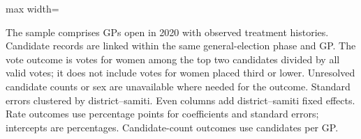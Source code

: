 \begin{table}[htbp]
\begin{adjustbox}{max width=\linewidth}
\begin{threeparttable}[b]
         \begin{tablenotes}
            \item The sample comprises GPs open in 2020 with observed treatment histories. Candidate records are linked within the same general-election phase and GP. The vote outcome is votes for women among the top two candidates divided by all valid votes; it does not include votes for women placed third or lower. Unresolved candidate counts or sex are unavailable where needed for the outcome. Standard errors clustered by district--samiti. Even columns add district--samiti fixed effects. Rate outcomes use percentage points for coefficients and standard errors; intercepts are percentages. Candidate-count outcomes use candidates per GP.
         \end{tablenotes}
      \end{threeparttable}
   \end{adjustbox}
\end{table}



